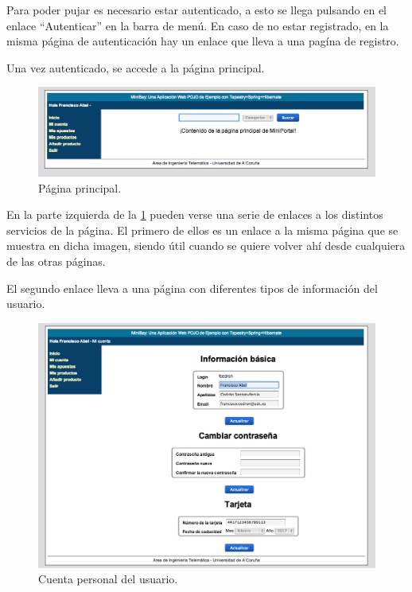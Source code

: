 \documentclass[12pt,a4paper,twoside,spanish]{article}      %
\begin{document}
Para poder pujar es necesario estar autenticado, a esto se llega pulsando en el enlace ``Autenticar'' en la barra de menú. En
caso de no estar registrado, en la misma página de autenticación hay un enlace que lleva a una pagína de registro.

Una vez autenticado, se accede a la página principal.
\begin{figure}[H]
  \centering
    \includegraphics[width=1\textwidth]{pagina_principal.png}
  \caption{Página principal.}
  \label{fig:Principal}
\end{figure}

En la parte izquierda de la \ref{fig:Principal} pueden verse una serie de enlaces a los distintos servicios de la página. El primero de ellos es un enlace a la misma página que se muestra en dicha imagen, siendo útil cuando se quiere volver ahí desde cualquiera de las otras páginas.


El segundo enlace lleva a una página con diferentes tipos de información del usuario.

\begin{figure}[H]
  \centering
    \includegraphics[width=1\textwidth]{mi_cuenta.png}
  \caption{Cuenta personal del usuario.}
  \label{fig:myaccount}
\end{figure}
\end{document}

